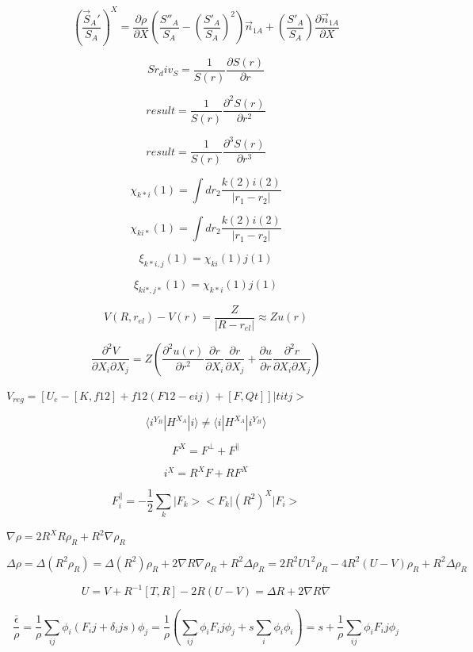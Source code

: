 \documentclass{article}
\begin{document}
\[
\left(\frac{\vec S_A'}{S_A}\right)^X =
    \frac{\partial \rho}{\partial X}\left(\frac{S''_A}{S_A}
         -\left(\frac{S'_A}{S_A}\right)^2\right)\vec n_{1A}
    + \left(\frac{S'_A}{S_A}\right)\frac{\partial \vec n_{1A}}{\partial X}
\]
\pagebreak

\[
    Sr_div_S = \frac{1}{S(r)}\frac{\partial S(r)}{\partial r}
\]
\pagebreak

\[
    result = \frac{1}{S(r)}\frac{\partial^2 S(r)}{\partial r^2}
\]
\pagebreak

\[
   result = \frac{1}{S(r)}\frac{\partial^3 S(r)}{\partial r^3}
\]
\pagebreak

\[ \chi_{k{*} i}(1) = \int dr_2 \frac{k(2) i(2)}{|r_1-r_2|} \]
\pagebreak

\[ \chi_{ki{*}}(1) = \int dr_2 \frac{k(2) i(2)}{|r_1-r_2|} \]
\pagebreak

\[ \xi_{k{*}i,j}(1) = \chi_{ki}(1) j(1) \]
\pagebreak

\[ \xi_{ki{*},j{*}}(1) = \chi_{k{*}i}(1) j(1) \]
\pagebreak

\[
V(R,r_{el}) -V(r) =\frac{Z}{|R-r_{el}|} \approx Z u(r) \]
\pagebreak

\[
\frac{\partial^2 V}{\partial X_i\partial X_j}
  =  Z \left(\frac{\partial^2 u(r)}{\partial r^2} \frac{\partial r}{\partial X_i}
     \frac{\partial r}{\partial X_j} + \frac{\partial u}{\partial r}
     \frac{\partial^2 r}{\partial X_i \partial X_j}\right)
\]
\pagebreak

$ V_{reg} = [ U_e - [K,f12] + f12(F12-eij) + [F,Qt] ]|titj> $
\pagebreak

\[
 \langle i^{Y_B}|H^{X_A}|i\rangle \neq \langle i|H^{X_A}|i^{Y_B}\rangle
\]
\pagebreak

\[
    F^X = F^\perp + F^\parallel
\]
\pagebreak

\[
  i^X   = R^X F + R F^X
\]
\pagebreak

\[
 F_i^\parallel = -\frac{1}{2}\sum_k|F_k ><F_k | (R^2)^X | F_i>
\]
\pagebreak

$ \nabla\rho = 2R^X R \rho_R + R^2\nabla \rho_R $
\pagebreak

\[
  \Delta \rho = \Delta (R^2 \rho_R)
         = \Delta (R^2) \rho_R + 2\nabla R \nabla \rho_R + R^2 \Delta \rho_R
         = 2 R^2 U1^2 \rho_R -4 R^2 ( U-V ) \rho_R + R^2 \Delta\rho_R
\]
\pagebreak

\[
  U=V + R^{-1}[T,R]
  -2 R (U-V) = \Delta R + 2\nabla R\dot \nabla
\]
\pagebreak

\[
\frac{\bar \epsilon}{\rho} = \frac{1}{\rho}\sum_{ij}\phi_i(F_ij+\delta_ij s)\phi_j
       = \frac{1}{\rho} ( \sum_{ij}\phi_i F_ij \phi_j + s\sum_i\phi_i\phi_i )
       = s + \frac{1}{\rho} \sum_{ij}\phi_i F_ij \phi_j
\]
\pagebreak
\end{document}
